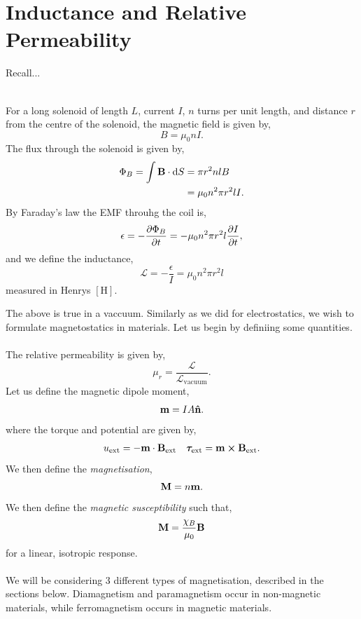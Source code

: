 \documentclass{book}
\begin{document}
\section{Inductance and Relative Permeability}
Recall...\\\\
\begin{tcolorbox}
For a long solenoid of length $L$, current $I$, $n$ turns per unit length, and distance $r$ from the centre of the solenoid, the magnetic field is given by,
\begin{equation}
	B = \mu_0 nI.
\end{equation}
The flux through the solenoid is given by,
\begin{equation}
	\begin{split}
	\Phi_B = \int \vb{B}\cdot\dd{S} & = \pi r^2 n l B \\
	& = \mu_0 n^2 \pi r^2 l I.
	\end{split}
\end{equation}
By Faraday's law the EMF throuhg the coil is,
\begin{equation}
	\epsilon = -\pdv{\Phi_B}{t} = -\mu_0n^2\pi r^2 l \pdv{I}{t},
\end{equation}
and we define the inductance,
\begin{equation}
	\mathcal{L} = -\frac{\epsilon}{I} = \mu_0 n^2 \pi r^2 l
\end{equation}
measured in Henrys $\left[\text{H}\right]$.
\end{tcolorbox}
\noindent
The above is true in a vaccuum. Similarly as we did for electrostatics, we wish to formulate magnetostatics in materials. Let us begin by definiing some quantities.
\\\\
The relative permeability is given by,
\begin{equation}
	\mu_r = \frac{\mathcal{L}}{\mathcal{L}_{\text{vacuum}}}.
\end{equation}
Let us define the magnetic dipole moment,
\begin{equation}
	\vb{m} = IA\vu{n}.
\end{equation}
where the torque and potential are given by,
\begin{align}
	u_{\text{ext}} = -\vb{m}\cdot\vb{B}_{\text{ext}} && \vb*{\tau}_{\text{ext}} = \vb{m}\cross\vb{B}_{\text{ext}}.
\end{align}
We then define the \textit{magnetisation},
\begin{equation}
	\vb{M} = n\vb{m}.
\end{equation}
We then define the \textit{magnetic susceptibility} such that,
\begin{equation}
	\vb{M} = \frac{\chi_B}{\mu_0}\vb{B} \label{eq:magnetic sus}
\end{equation}
for a linear, isotropic response.
\\\\
We will be considering 3 different types of magnetisation, described in the sections below. Diamagnetism and paramagnetism occur in non-magnetic materials, while ferromagnetism occurs in magnetic materials.
\end{document}
